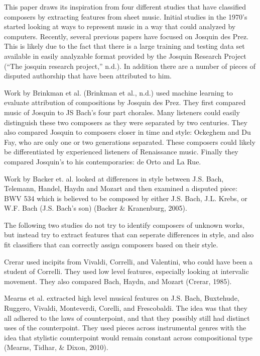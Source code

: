 \documentclass[12pt,twoside]{reedthesis}
\theoremstyle{definition}
\theoremstyle{definition}
\theoremstyle{definition}
\theoremstyle{remark}
\begin{document}
This paper draws its inspiration from four different studies that have
classified composers by extracting features from sheet music. Initial
studies in the 1970's started looking at ways to represent music in a
way that could analyzed by computers. Recently, several previous papers
have focused on Josquin des Prez. This is likely due to the fact that
there is a large training and testing data set available in easily
analyzable format provided by the Josquin Research Project (``The
josquin research project,'' n.d.). In addition there are a number of
pieces of disputed authorship that have been attributed to him.

Work by Brinkman et al. (Brinkman et al., n.d.) used machine learning to
evaluate attribution of compositions by Josquin des Prez. They first
compared music of Josquin to JS Bach's four part chorales. Many
listeners could easily distinguish these two composers as they were
separated by two centuries. They also compared Josquin to composers
closer in time and style: Ockeghem and Du Fay, who are only one or two
generations separated. These composers could likely be differentiated by
experienced listeners of Renaissance music. Finally they compared
Josquin's to his contemporaries: de Orto and La Rue.

Work by Backer et. al. looked at differences in style between J.S. Bach,
Telemann, Handel, Haydn and Mozart and then examined a disputed piece:
BWV 534 which is believed to be composed by either J.S. Bach, J.L.
Krebs, or W.F. Bach (J.S. Bach's son) (Backer \& Kranenburg, 2005).

The following two studies do not try to identify composers of unknown
works, but instead try to extract features that can seperate differences
in style, and also fit classifiers that can correctly assign composers
based on their style.

Crerar used incipits from Vivaldi, Correlli, and Valentini, who could
have been a student of Correlli. They used low level features,
especially looking at intervalic movement. They also compared Bach,
Haydn, and Mozart (Crerar, 1985).

Mearns et al. extracted high level musical features on J.S. Bach,
Buxtehude, Ruggero, Vivaldi, Monteverdi, Corelli, and Frescobaldi. The
idea was that they all adhered to the laws of counterpoint, and that
they possibly still had distinct uses of the counterpoint. They used
pieces across instrumental genres with the idea that stylistic
counterpoint would remain constant across compositional type (Mearns,
Tidhar, \& Dixon, 2010).
\end{document}
